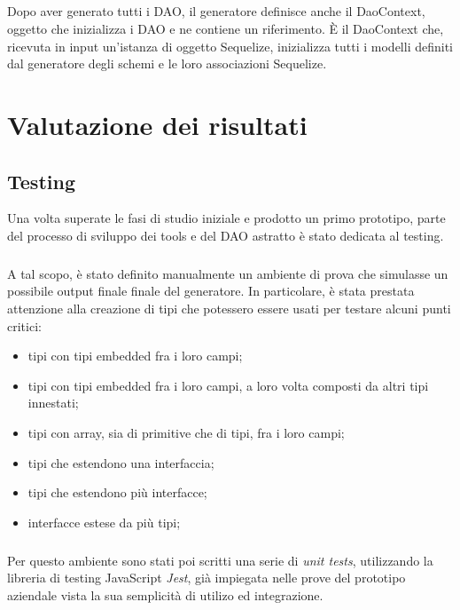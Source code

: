 \documentclass[a4paper, 12pt]{report}
\begin{document}
      \paragraph*{}
      Dopo aver generato tutti i DAO, il generatore definisce anche il DaoContext, oggetto che inizializza i DAO e ne contiene un riferimento.
      È il DaoContext che, ricevuta in input un'istanza di oggetto Sequelize, inizializza tutti i modelli definiti dal generatore degli schemi e le loro associazioni Sequelize. 
    \newpage
    \chapter{Valutazione dei risultati}
      \section{Testing}
        Una volta superate le fasi di studio iniziale e prodotto un primo prototipo, parte del processo di sviluppo dei tools e del DAO astratto è stato dedicata al testing.
        \paragraph*{}
          A tal scopo, è stato definito manualmente un ambiente di prova che simulasse un possibile output finale finale del generatore.
          In particolare, è stata prestata attenzione alla creazione di tipi che potessero essere usati per testare alcuni punti critici:
          \begin{itemize}
            \item tipi con tipi embedded fra i loro campi;
            \item tipi con tipi embedded fra i loro campi, a loro volta composti da altri tipi innestati;
            \item tipi con array, sia di primitive che di tipi, fra i loro campi;
            \item tipi che estendono una interfaccia;
            \item tipi che estendono più interfacce;
            \item interfacce estese da più tipi;
          \end{itemize}
        \paragraph*{}
          Per questo ambiente sono stati poi scritti una serie di \emph{unit tests}, utilizzando la libreria di testing JavaScript \emph{Jest}, già impiegata nelle prove del prototipo aziendale vista la sua semplicità di utilizo ed integrazione.
\end{document}
